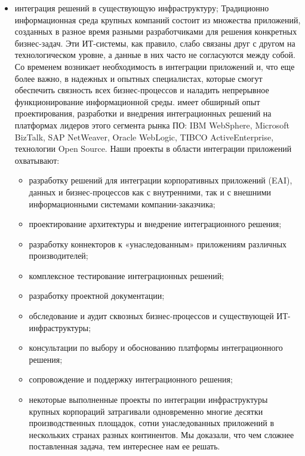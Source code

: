 \begin{itemize}
  \item интеграция решений в существующую инфраструктуру;
  Традиционно информационная среда крупных компаний состоит из множества приложений, созданных в разное время разными разработчиками для решения конкретных бизнес-задач. Эти ИТ-системы, как правило, слабо связаны друг с другом на технологическом уровне, а данные в них часто не согласуются между собой. Со временем возникает необходимость в интеграции приложений и, что еще более важно, в надежных и опытных специалистах, которые смогут обеспечить связность всех бизнес-процессов и наладить непрерывное функционирование информационной среды.
  \company{} имеет обширный опыт проектирования, разработки и внедрения интеграционных решений на платформах лидеров этого сегмента рынка ПО: IBM WebSphere, Microsoft BizTalk, SAP NetWeaver, Oracle WebLogic, TIBCO ActiveEnterprise, технологии Open Source.
  Наши проекты в области интеграции приложений охватывают:
  \begin{itemize}
    \item разработку решений для интеграции корпоративных приложений (EAI), данных и бизнес-процессов как с внутренними, так и с внешними информационными системами компании-заказчика;
    \item проектирование архитектуры и внедрение интеграционного решения;
    \item разработку коннекторов к «унаследованным» приложениям различных производителей;
    \item комплексное тестирование интеграционных решений;
    \item разработку проектной документации;
    \item обследование и аудит сквозных бизнес-процессов и существующей ИТ-инфраструктуры;
    \item консультации по выбору и обоснованию платформы интеграционного решения;
    \item сопровождение и поддержку интеграционного решения;
    \item некоторые выполненные \company{} проекты по интеграции инфраструктуры крупных корпораций затрагивали одновременно многие десятки производственных площадок, сотни унаследованных приложений в нескольких странах разных континентов. Мы доказали, что чем сложнее поставленная задача, тем интереснее нам ее решать.
  \end{itemize}


\end{itemize}
